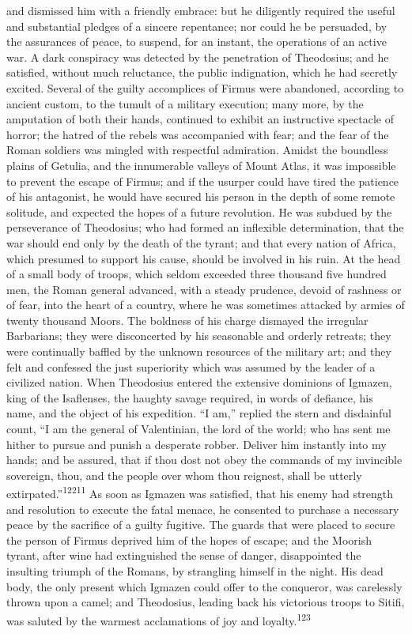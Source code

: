 and dismissed him with a friendly embrace: but he diligently
required the useful and substantial pledges of a sincere
repentance; nor could he be persuaded, by the assurances of
peace, to suspend, for an instant, the operations of an active
war. A dark conspiracy was detected by the penetration of
Theodosius; and he satisfied, without much reluctance, the public
indignation, which he had secretly excited. Several of the guilty
accomplices of Firmus were abandoned, according to ancient
custom, to the tumult of a military execution; many more, by the
amputation of both their hands, continued to exhibit an
instructive spectacle of horror; the hatred of the rebels was
accompanied with fear; and the fear of the Roman soldiers was
mingled with respectful admiration. Amidst the boundless plains
of Getulia, and the innumerable valleys of Mount Atlas, it was
impossible to prevent the escape of Firmus; and if the usurper
could have tired the patience of his antagonist, he would have
secured his person in the depth of some remote solitude, and
expected the hopes of a future revolution. He was subdued by the
perseverance of Theodosius; who had formed an inflexible
determination, that the war should end only by the death of the
tyrant; and that every nation of Africa, which presumed to
support his cause, should be involved in his ruin. At the head of
a small body of troops, which seldom exceeded three thousand five
hundred men, the Roman general advanced, with a steady prudence,
devoid of rashness or of fear, into the heart of a country, where
he was sometimes attacked by armies of twenty thousand Moors. The
boldness of his charge dismayed the irregular Barbarians; they
were disconcerted by his seasonable and orderly retreats; they
were continually baffled by the unknown resources of the military
art; and they felt and confessed the just superiority which was
assumed by the leader of a civilized nation. When Theodosius
entered the extensive dominions of Igmazen, king of the
Isaflenses, the haughty savage required, in words of defiance,
his name, and the object of his expedition. “I am,” replied the
stern and disdainful count, “I am the general of Valentinian, the
lord of the world; who has sent me hither to pursue and punish a
desperate robber. Deliver him instantly into my hands; and be
assured, that if thou dost not obey the commands of my invincible
sovereign, thou, and the people over whom thou reignest, shall be
utterly extirpated.”\textsuperscript{12211} As soon as Igmazen was satisfied, that
his enemy had strength and resolution to execute the fatal
menace, he consented to purchase a necessary peace by the
sacrifice of a guilty fugitive. The guards that were placed to
secure the person of Firmus deprived him of the hopes of escape;
and the Moorish tyrant, after wine had extinguished the sense of
danger, disappointed the insulting triumph of the Romans, by
strangling himself in the night. His dead body, the only present
which Igmazen could offer to the conqueror, was carelessly thrown
upon a camel; and Theodosius, leading back his victorious troops
to Sitifi, was saluted by the warmest acclamations of joy and
loyalty.\textsuperscript{123}

